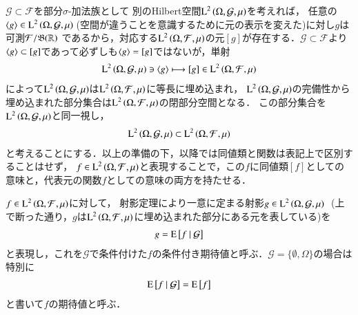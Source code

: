 	$\mathcal{G} \subset \mathcal{F}$を部分$\sigma$-加法族として
	別のHilbert空間$\operatorname{L}^{2} \left(\Omega, \mathcal{G},\mu\right)$を考えれば，
	任意の$\inprod<g> \in \Lp{2}{\Omega, \mathcal{G},\mu}\ $(空間が違うことを意識するために元の表示を変えた)に対し$g$は可測$\mathcal{F}/\mathfrak{B}(\mathbb{R})$
	であるから，対応する$\operatorname{L}^{2} \left(\Omega, \mathcal{F},\mu\right)$の元$[g]$が存在する．$\mathcal{G} \subset \mathcal{F}$より
	$\inprod<g> \subset [g]$であって必ずしも$\inprod<g> = [g]$ではないが，単射
	\begin{align}
		\Lp{2}{\Omega, \mathcal{G},\mu} \ni \inprod<g> \longmapsto [g] \in \Lp{2}{\Omega, \mathcal{F},\mu}
	\end{align}
	によって$\operatorname{L}^{2} \left(\Omega, \mathcal{G},\mu\right)$は$\operatorname{L}^{2} \left(\Omega, \mathcal{F},\mu\right)$に等長に埋め込まれ，
	$\operatorname{L}^{2} \left(\Omega, \mathcal{G},\mu\right)$の完備性から埋め込まれた部分集合は$\operatorname{L}^{2} \left(\Omega, \mathcal{F},\mu\right)$の閉部分空間となる．
	この部分集合を$\operatorname{L}^{2} \left(\Omega, \mathcal{G},\mu\right)$と同一視し，
	\begin{align}
		\operatorname{L}^{2} \left(\Omega, \mathcal{G},\mu\right) \subset \operatorname{L}^{2} \left(\Omega, \mathcal{F},\mu\right)
	\end{align}
	と考えることにする．以上の準備の下，以降では同値類と関数は表記上で区別することはせず，
	$f \in \operatorname{L}^{2} \left(\Omega, \mathcal{F},\mu\right)$と表現することで，この$f$に同値類$[f]$としての意味と，代表元の関数$f$としての意味の両方を持たせる．
	
	\begin{dfn}[条件付き期待値]
		$f \in \operatorname{L}^{2} \left(\Omega, \mathcal{F},\mu\right)$に対して，
		射影定理により一意に定まる射影$g \in \operatorname{L}^{2} \left(\Omega, \mathcal{G},\mu\right)\ $
		(上で断った通り，$g$は$\operatorname{L}^{2} \left(\Omega, \mathcal{F},\mu\right)$に埋め込まれた部分にある元を表している)を
		\begin{align}
			g = \operatorname{E} \left[ f \ \middle|\ \mathcal{G} \right]
		\end{align}
		と表現し，これを$\mathcal{G}$で条件付けた$f$の条件付き期待値と呼ぶ．$\mathcal{G} = \{\emptyset, \Omega\}$の場合は特別に
		\begin{align}
			\operatorname{E} \left[ f \ \middle|\ \mathcal{G} \right] = \operatorname{E} \left[ f \right]
		\end{align}
		と書いて$f$の期待値と呼ぶ．
	\end{dfn}
	

